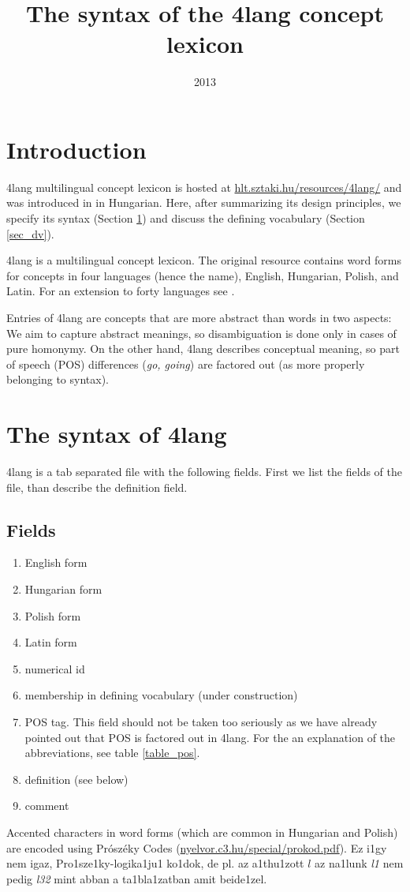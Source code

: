 \documentclass[a4paper,10pt]{article}
\title{The syntax of the 4lang concept lexicon}
\date{2013}
\begin{document}
\maketitle
\section*{Introduction}
    4lang multilingual concept lexicon is hosted at \url{hlt.sztaki.hu/resources/4lang/} and was introduced in \cite{Kornai:2013} in Hungarian. Here, after summarizing its design principles, we specify                        its syntax (Section \ref{sec_synt}) and discuss the defining vocabulary (Section \ref{sec_dv}).

4lang is a multilingual concept lexicon. The original resource contains word forms for concepts in four languages (hence the name), English, Hungarian, Polish, and Latin. For an extension to forty languages see \cite{Acs:2013}.

Entries of 4lang are concepts that are more abstract than words in two
aspects: We aim to capture abstract meanings, so disambiguation is done only
in cases of pure homonymy. On the other hand, 4lang describes conceptual
meaning, so part of speech (POS) differences (\emph{go, going}) are factored
out (as more properly belonging to syntax).
\section{The syntax of 4lang}\label{sec_synt}
4lang is a tab separated file with the following fields. First we list the fields of the file, than describe the definition field.
\subsection{Fields}
\begin{enumerate}
 \item English form
\item Hungarian form
\item Polish form
\item Latin form
\item numerical id
\item membership in defining vocabulary (under construction)
\item POS tag. This field should not be taken too seriously as we have already pointed out that POS is factored out in 4lang. For the an explanation of the abbreviations, see table \ref{table_pos}.
\item definition (see below)
\item comment
\end{enumerate}
Accented characters in word forms (which are common in Hungarian and Polish)
are encoded using Prószéky Codes (\url{nyelvor.c3.hu/special/prokod.pdf}). 
{\color{red} Ez i1gy nem igaz, Pro1sze1ky-logika1ju1 ko1dok, de pl. az
  a1thu1zott $l$ az na1lunk {\it l1} nem pedig {\it l32} mint abban a 
ta1bla1zatban amit beide1zel.}
\end{document}
